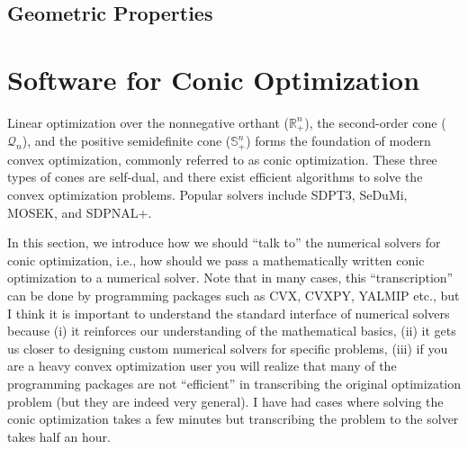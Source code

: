 \documentclass[
]{book}
\theoremstyle{definition}
\theoremstyle{definition}
\theoremstyle{definition}
\theoremstyle{definition}
\theoremstyle{remark}
\begin{document}
\subsection{Geometric Properties}\label{geometric-properties-1}

\section{Software for Conic Optimization}\label{SoftwareConic}

Linear optimization over the nonnegative orthant (\(\mathbb{R}^{n}_{+}\)), the second-order cone (\(\mathcal{Q}_{n}\)), and the positive semidefinite cone (\(\mathbb{S}^{n}_{+}\)) forms the foundation of modern convex optimization, commonly referred to as conic optimization. These three types of cones are self-dual, and there exist efficient algorithms to solve the convex optimization problems. Popular solvers include SDPT3, SeDuMi, MOSEK, and SDPNAL+.

In this section, we introduce how we should ``talk to'' the numerical solvers for conic optimization, i.e., how should we pass a mathematically written conic optimization to a numerical solver. Note that in many cases, this ``transcription'' can be done by programming packages such as CVX, CVXPY, YALMIP etc., but I think it is important to understand the standard interface of numerical solvers because (i) it reinforces our understanding of the mathematical basics, (ii) it gets us closer to designing custom numerical solvers for specific problems, (iii) if you are a heavy convex optimization user you will realize that many of the programming packages are not ``efficient'' in transcribing the original optimization problem (but they are indeed very general). I have had cases where solving the conic optimization takes a few minutes but transcribing the problem to the solver takes half an hour.
\end{document}
